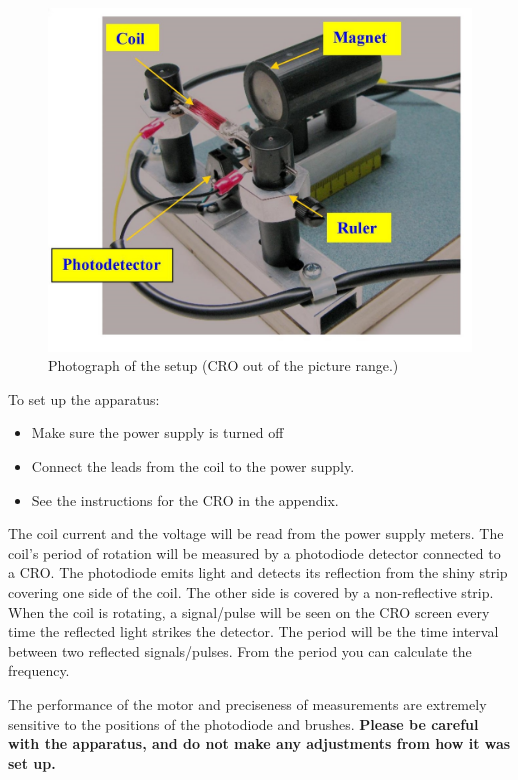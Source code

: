\documentclass[12pt]{report}
\begin{document}
\begin{figure}[h]
\centering
\includegraphics[scale=0.9]{lab3-sessionb-setup}
\caption{Photograph of the setup (CRO out of the picture range.)}
\label{Fig:lab3-sessionb-setup}
\end{figure}

To set up the apparatus:
\begin{itemize}
\item Make sure the power supply is turned off
\item Connect the leads from the coil to the power supply.
\item See the instructions for the CRO in the appendix.
\end{itemize}

The coil current and the voltage will be read from the power supply meters. The coil's period of rotation will be measured by a photodiode detector connected to a CRO. The photodiode emits light and detects its reflection from the shiny strip covering one side of the coil. The other side is covered by a non-reflective strip. When the coil is rotating, a signal/pulse will be seen on the CRO screen every time the reflected light strikes the detector. The period will be the time interval between two reflected signals/pulses. From the period you can calculate the frequency. 

The performance of the motor and preciseness of measurements are extremely sensitive to the positions of the photodiode and brushes. \textbf{Please be careful with the apparatus, and do not make any adjustments from how it was set up.}
\end{document}
